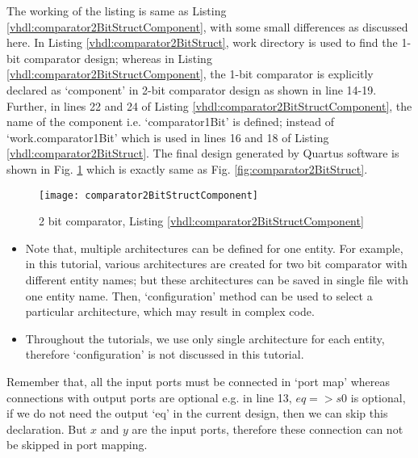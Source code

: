 


\begin{explanation}
	The working of the listing is same as Listing \ref{vhdl:comparator2BitStructComponent}, with some small differences as discussed here. 	In Listing \ref{vhdl:comparator2BitStruct}, work directory is used to find the 1-bit comparator design; whereas in Listing \ref{vhdl:comparator2BitStructComponent}, the 1-bit comparator is explicitly declared as `component' in 2-bit comparator design as shown in line 14-19. Further, in lines 22 and 24 of  Listing \ref{vhdl:comparator2BitStructComponent}, the name of the component i.e. `comparator1Bit' is defined; instead of `work.comparator1Bit' which is used in lines 16 and 18 of Listing \ref{vhdl:comparator2BitStruct}. The final design generated by Quartus software is shown in Fig. \ref{fig:comparator2BitStructComponent} which is exactly same as  Fig. \ref{fig:comparator2BitStruct}.
\end{explanation}


\begin{figure}
	\centering
	\texttt{[image: comparator2BitStructComponent]}
	\caption{2 bit comparator, Listing \ref{vhdl:comparator2BitStructComponent}}
	\label{fig:comparator2BitStructComponent}
\end{figure}

\begin{itemize}
	\item Note that, multiple architectures can be defined for one entity. For example, in this tutorial, various architectures are created for two bit comparator with different entity names; but these architectures can be saved in single file with one entity name. Then, `configuration' method can be used to select a particular architecture, which may result in complex code.   
	
	\item Throughout the tutorials, we use only single architecture for each entity, therefore `configuration' is not discussed in this tutorial. 
\end{itemize}

\begin{noNumBox}
	Remember that, all the input ports must be connected in `port map' whereas connections with output ports are optional e.g. in line 13, $eq=>s0$ is optional, if we do not need the output `eq' in the current design, then we can skip this declaration. But $x$ and $y$ are the input ports, therefore these connection can not be skipped in port mapping.	 
\end{noNumBox}


